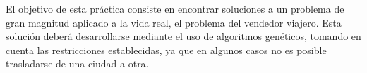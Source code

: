El objetivo de esta práctica consiste en encontrar soluciones a un problema de gran magnitud aplicado a la vida real, el problema del vendedor viajero. Esta solución deberá desarrollarse mediante el uso de algoritmos genéticos, tomando en cuenta las restricciones establecidas, ya que en algunos casos no es posible trasladarse de una ciudad a otra.
